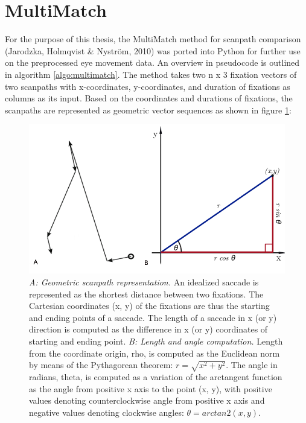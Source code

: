 \documentclass[a4paper, 11pt]{scrreprt}
\begin{document}
\section{MultiMatch}
For the purpose of this thesis, the MultiMatch method for scanpath comparison (Jarodzka, Holmqvist \& Nyström, 2010) was ported into Python for further use on the preprocessed eye movement data. An overview in pseudocode is outlined in algorithm \ref{algo:multimatch}. \newline 
The method takes two n x 3 fixation vectors of two scanpaths with x-coordinates, y-coordinates, and duration of fixations as columns as its input. Based on the coordinates and durations of fixations, the scanpaths are represented as geometric vector sequences as shown in figure \ref{fig:Polar_to_cartesian}:

\begin{figure}[H]
		\includegraphics[scale=0.35]{img/scanpathconversion.png}
		\caption[Geometric representation of eye movements]
		{\small{\textit{A: Geometric scanpath representation.} An idealized saccade is represented as the shortest distance between two fixations. The Cartesian coordinates (x, y) of the fixations are thus the starting and ending points of a saccade. The length of a saccade in x (or y) direction is computed as the difference in x (or y) coordinates of starting and ending point. \newline
		\textit{B: Length and angle computation.} Length from the coordinate origin, rho, is computed as the Euclidean norm by means of the Pythagorean theorem: $r = \sqrt{ x^2 + y^2}$. The angle in radians, theta, is computed as a variation of the arctangent function as the angle from positive x axis to the point (x, y), with positive values denoting counterclockwise angle from positive x axis and negative values denoting clockwise angles: $\theta = arctan2(x, y)$.}}
		\label{fig:Polar_to_cartesian}
\end{figure}
\end{document}
